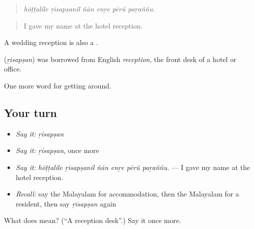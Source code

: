 \begin{quote}
\emph{hōṭṭalile ṟisapṣanil ñān enṟe pērŭ paṟaññu.}
\end{quote}

\begin{quote}
I gave my name at the hotel reception.
\end{quote}

A wedding reception is also a .

\begin{cousinweb}
\textbf{} (\emph{ṟisapṣan}) was borrowed from English \emph{reception}, the front desk of a hotel or office.
\end{cousinweb}

\begin{grammarlens}[title={What you've built}]
One more word for getting around.
\end{grammarlens}

\subsection*{Your turn}
\begin{itemize}
\raggedright
  \item \emph{Say it:} \emph{ṟisapṣan}
  \item \emph{Say it:} \emph{ṟisapṣan}, once more
  \item \emph{Say it:} \emph{hōṭṭalile ṟisapṣanil ñān enṟe pērŭ paṟaññu.} — I gave my name at the hotel reception.
  \item \emph{Recall:} say the Malayalam for accommodation, then the Malayalam for a resident, then say \emph{ṟisapṣan} again
\end{itemize}

\begin{tcolorbox}[breakable,colback=teal!4,colframe=teal!35!black,title={Before you move on}]
What does  mean? (\textquotedblleft{}A reception desk\textquotedblright{}.) Say it once more.
\end{tcolorbox}
